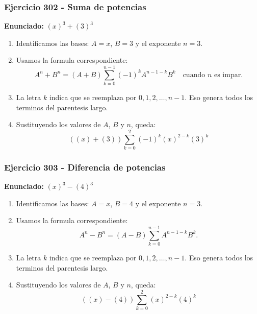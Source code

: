\documentclass[11pt,a4paper]{article}
\begin{document}
\subsubsection*{Ejercicio 302 - Suma de potencias}
\textbf{Enunciado:} $ \left(x\right)^{3}+\left(3\right)^{3} $\par
\begin{enumerate}[leftmargin=2em]
\item Identificamos las bases: \(A=x\), \(B=3\) y el exponente \(n=3\).
\item Usamos la formula correspondiente: \[A^n+B^n=(A+B)\sum_{k=0}^{n-1}(-1)^kA^{n-1-k}B^k\quad\text{cuando }n\text{ es impar}.\]
\item La letra \(k\) indica que se reemplaza por \(0,1,2,\ldots,n-1\). Eso genera todos los terminos del parentesis largo.
\item Sustituyendo los valores de \(A\), \(B\) y \(n\), queda: \[\boxed{\left(\left(x\right)+\left(3\right)\right)\sum_{k=0}^{2}(-1)^k\left(x\right)^{2-k}\left(3\right)^k}\]
\end{enumerate}

\vspace{0.2cm}
\subsubsection*{Ejercicio 303 - Diferencia de potencias}
\textbf{Enunciado:} $ \left(x\right)^{3}-\left(4\right)^{3} $\par
\begin{enumerate}[leftmargin=2em]
\item Identificamos las bases: \(A=x\), \(B=4\) y el exponente \(n=3\).
\item Usamos la formula correspondiente: \[A^n-B^n=(A-B)\sum_{k=0}^{n-1}A^{n-1-k}B^k.\]
\item La letra \(k\) indica que se reemplaza por \(0,1,2,\ldots,n-1\). Eso genera todos los terminos del parentesis largo.
\item Sustituyendo los valores de \(A\), \(B\) y \(n\), queda: \[\boxed{\left(\left(x\right)-\left(4\right)\right)\sum_{k=0}^{2}\left(x\right)^{2-k}\left(4\right)^k}\]
\end{enumerate}

\vspace{0.2cm}
\end{document}
